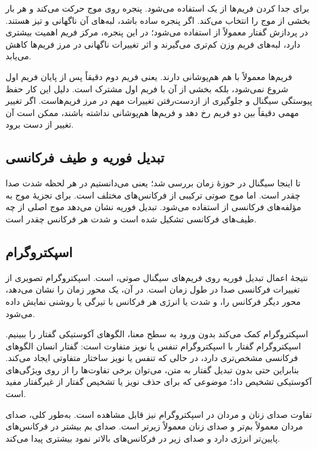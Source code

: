 برای جدا کردن فریم‌ها از یک  استفاده می‌شود. پنجره روی موج حرکت می‌کند و هر بار بخشی از موج را انتخاب می‌کند. اگر پنجره ساده باشد، لبه‌های آن ناگهانی و تیز هستند. در پردازش گفتار معمولاً از  استفاده می‌شود؛ در این پنجره، مرکز فریم اهمیت بیشتری دارد، لبه‌های فریم وزن کم‌تری می‌گیرند و اثر تغییرات ناگهانی در مرز فریم‌ها کاهش می‌یابد.

فریم‌ها معمولاً با هم هم‌پوشانی دارند. یعنی فریم دوم دقیقاً پس از پایان فریم اول شروع نمی‌شود، بلکه بخشی از آن با فریم اول مشترک است. دلیل این کار حفظ پیوستگی سیگنال و جلوگیری از ازدست‌رفتن تغییرات مهم در مرز فریم‌هاست. اگر تغییر مهمی دقیقاً بین دو فریم رخ دهد و فریم‌ها هم‌پوشانی نداشته باشند، ممکن است آن تغییر از دست برود.

\subsection{تبدیل فوریه و طیف فرکانسی}
تا اینجا سیگنال در حوزهٔ زمان بررسی شد؛ یعنی می‌دانستیم در هر لحظه شدت صدا چقدر است. اما موج صوتی ترکیبی از فرکانس‌های مختلف است. برای تجزیهٔ موج به مؤلفه‌های فرکانسی از  استفاده می‌شود. تبدیل فوریه نشان می‌دهد موج اصلی از چه طیف‌های فرکانسی تشکیل شده است و شدت هر فرکانس چقدر است.

\subsection{اسپکتروگرام}
نتیجهٔ اعمال تبدیل فوریه روی فریم‌های سیگنال صوتی،  است. اسپکتروگرام تصویری از تغییرات فرکانسی صدا در طول زمان است. در آن، یک محور زمان را نشان می‌دهد، محور دیگر فرکانس را، و شدت یا انرژی هر فرکانس با تیرگی یا روشنی نمایش داده می‌شود.

اسپکتروگرام کمک می‌کند بدون ورود به سطح معنا، الگوهای آکوستیکی گفتار را ببینیم. اسپکتروگرام گفتار با اسپکتروگرام تنفس یا نویز متفاوت است: گفتار انسان الگوهای فرکانسی مشخص‌تری دارد، در حالی که تنفس یا نویز ساختار متفاوتی ایجاد می‌کند. بنابراین حتی بدون تبدیل گفتار به متن، می‌توان برخی تفاوت‌ها را از روی ویژگی‌های آکوستیکی تشخیص داد؛ موضوعی که برای حذف نویز یا تشخیص گفتار از غیرگفتار مفید است.


تفاوت صدای زنان و مردان در اسپکتروگرام نیز قابل مشاهده است. به‌طور کلی، صدای مردان معمولاً بم‌تر و صدای زنان معمولاً زیرتر است. صدای بم بیشتر در فرکانس‌های پایین‌تر انرژی دارد و صدای زیر در فرکانس‌های بالاتر نمود بیشتری پیدا می‌کند.

